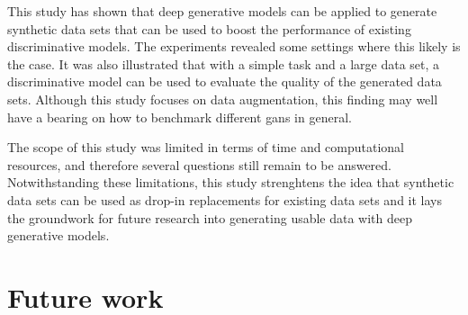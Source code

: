 This study has shown that deep generative models can be applied to generate synthetic data sets that can be used to boost the performance of existing discriminative models. The experiments revealed some settings where this likely is the case. It was also illustrated that with a simple task and a large data set, a discriminative model can be used to evaluate the quality of the generated data sets. Although this study focuses on data augmentation, this finding may well have a bearing on how to benchmark different \acrshort{gans} in general. 

The scope of this study was limited in terms of time and computational resources, and therefore several questions still remain to be answered. Notwithstanding these limitations, this study strenghtens the idea that synthetic data sets can be used as drop-in replacements for existing data sets and it lays the groundwork for future research into generating usable data with deep generative models.

\section{Future work}



